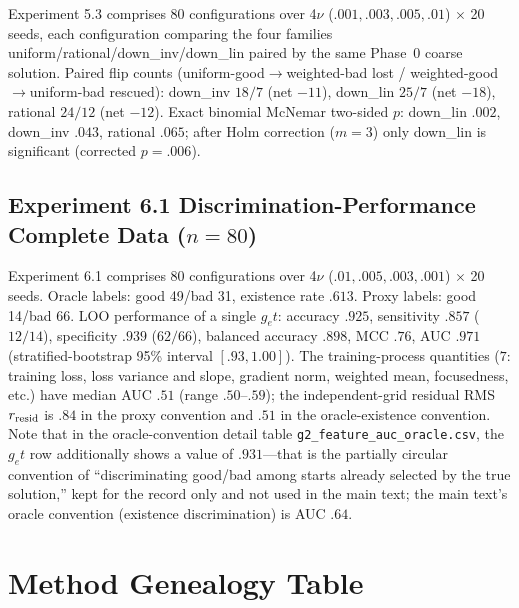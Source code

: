 \documentclass[11pt]{article}
\numberwithin{equation}{section}
\begin{document}
Experiment 5.3 comprises 80 configurations over 4$\nu$ ($.001,.003,.005,.01$) $\times$ 20 seeds, each configuration comparing the four families uniform/rational/down\_inv/down\_lin paired by the same Phase~0 coarse solution. Paired flip counts (uniform-good$\to$weighted-bad lost / weighted-good$\to$uniform-bad rescued): down\_inv $18/7$ (net $-11$), down\_lin $25/7$ (net $-18$), rational $24/12$ (net $-12$). Exact binomial McNemar two-sided $p$: down\_lin $.002$, down\_inv $.043$, rational $.065$; after Holm correction ($m=3$) only down\_lin is significant (corrected $p=.006$).

\subsection{Experiment 6.1 Discrimination-Performance Complete Data ($n=80$)}

Experiment 6.1 comprises 80 configurations over 4$\nu$ ($.01,.005,.003,.001$) $\times$ 20 seeds. Oracle labels: good 49/bad 31, existence rate $.613$. Proxy labels: good 14/bad 66. LOO performance of a single $g_et$: accuracy $.925$, sensitivity $.857$ ($12/14$), specificity $.939$ ($62/66$), balanced accuracy $.898$, MCC $.76$, AUC $.971$ (stratified-bootstrap 95\% interval $[.93,1.00]$). The training-process quantities ($7$: training loss, loss variance and slope, gradient norm, weighted mean, focusedness, etc.) have median AUC $.51$ (range $.50$--$.59$); the independent-grid residual RMS $r_{\rm resid}$ is $.84$ in the proxy convention and $.51$ in the oracle-existence convention. Note that in the oracle-convention detail table \texttt{g2\_\hspace{0pt}feature\_\hspace{0pt}auc\_\hspace{0pt}oracle.csv}, the $g_et$ row additionally shows a value of $.931$---that is the partially circular convention of ``discriminating good/bad among starts already selected by the true solution,'' kept for the record only and not used in the main text; the main text's oracle convention (existence discrimination) is AUC $.64$.

\section{Method Genealogy Table}\label{app:lineage}
\end{document}
